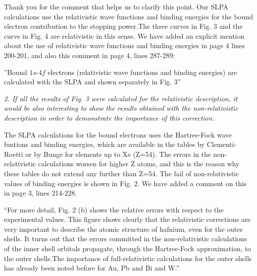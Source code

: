 \documentclass[a4paper,10pt]{article}
\begin{document}
\vspace{0.1cm}
{\color{red} Thank you for the comment that helps us to clarify this point. Our SLPA calculations use the relativistic wave functions and binding energies for the bound electron contribution to the stopping power.The three curves in Fig. 3 and the curve in Fig. 4 are relativistic in this sense. We have added an explicit mention about the use of relativistic wave functions and binding energies in page 4 lines 200-201, and also this comment in page 4, lines 287-289:}

{\small ''Bound $1s$-$4f$ electrons (relativistic wave functions and binding energies) are calculated with the SLPA and shown separately in Fig. 3''}

\vspace{0.25cm}
\textsl{
2. If all the results of Fig. 3 were calculated for the relativistic
description, it would be also interesting to show the results obtained
with the non-relativistic description in order to demonstrate the
importance of this correction.}

\vspace{0.1cm}
{\color{red}  The SLPA calculations for the bound electrons uses the Hartree-Fock wave funtions and binding energies, which are available in the tables by Clementi-Roetti or by Bunge for elements up to Xe (Z=54). The errors in the non-relativistic calculations worsen for higher Z atoms, and this is the reason why these tables do not extend any further than Z=54.  The fail of non-relativistic values of binding energies is shown in Fig. 2. We have added a comment on this in page 3, lines 214-228. }

\vspace{0.1cm}
{\small ``For more detail, Fig. 2 (b) shows  the relative errors
with respect to the experimental  values.
This figure shows clearly that the relativistic corrections are very important to describe
the atomic structure of hafnium, even for the outer shells.
It turns out that the errors committed in the non-relativistic calculations of the inner shell orbitals 
propagate, through the Hartree-Fock approximation, to the outer shells.The importance of full-relativistic calculations for the outer shells has already been noted before for Au, Pb and Bi and W.''}
\end{document}

